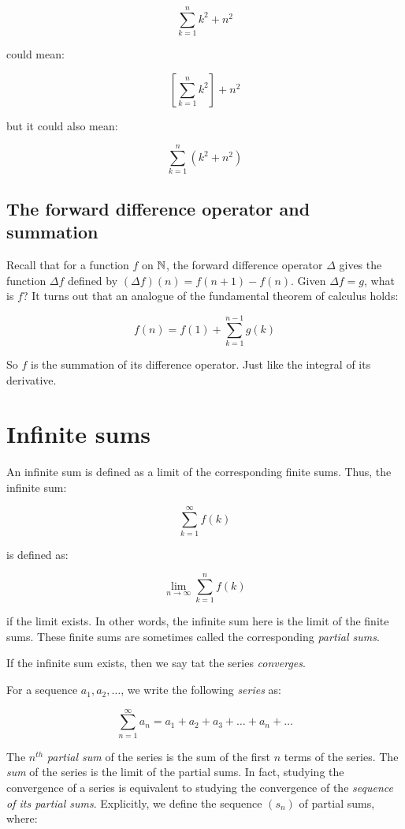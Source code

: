 \documentclass{amsart}
\begin{document}
$$\sum_{k=1}^n k^2 + n^2$$

could mean:

$$\left[\sum_{k=1}^n k^2 \right] + n^2$$

but it could also mean:

$$\sum_{k=1}^n (k^2 + n^2)$$

\subsection{The forward difference operator and summation}

Recall that for a function $f$ on $\mathbb{N}$, the forward difference
operator $\Delta$ gives the function $\Delta f$ defined by $(\Delta
f)(n) = f(n + 1) - f(n)$. Given $\Delta f = g$, what is $f$? It turns out
that an analogue of the fundamental theorem of calculus holds:

$$f(n) = f(1) + \sum_{k=1}^{n-1} g(k)$$

So $f$ is the summation of its difference operator. Just like the
integral of its derivative.

\section{Infinite sums}

An infinite sum is defined as a limit of the corresponding finite
sums. Thus, the infinite sum:

$$\sum_{k=1}^\infty f(k)$$

is defined as:

$$\lim_{n \to \infty} \sum_{k=1}^n f(k)$$

if the limit exists. In other words, the infinite sum here is the
limit of the finite sums. These finite sums are sometimes called the
corresponding {\em partial sums}. 

If the infinite sum exists, then we say tat the series {\em converges}.

For a sequence $a_1, a_2, \dots$, we write the following {\em series} as:

$$\sum_{n=1}^\infty a_n = a_1 + a_2 + a_3 + \dots + a_n + \dots$$

The $n^{th}$ {\em partial sum} of the series is the sum of the first
$n$ terms of the series. The {\em sum} of the series is the limit of
the partial sums. In fact, studying the convergence of a series is
equivalent to studying the convergence of the {\em sequence of
its partial sums}. Explicitly, we define the sequence $(s_n)$ of
partial sums, where:
\end{document}
